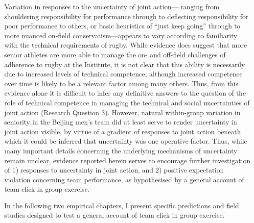 \begin{CJK}{UTF8}{gbsn}
Variation in responses to the uncertainty of joint action--- ranging from shouldering responsibility for performance through to deflecting responsibility for poor performance to others, or basic heuristics of ``just keep going'' through to more nuanced on-field conservatism---appears to vary according to familiarity with the technical requirements of rugby.  While evidence does suggest that more senior athletes are more able to manage the on- and off-field challenges of adherence to rugby at the Institute, it is not clear that this ability is necessarily due to increased levels of technical competence, although increased competence over time is likely to be a relevant factor among many others.  Thus, from this evidence alone it is difficult to infer any definitive answers to the question of the role of technical competence in managing the technical and social uncertainties of joint action (Research Question 3).  However, natural within-group variation in seniority in the Beijing men's team did at least serve to render uncertainty in joint action visible, by virtue of a gradient of responses to joint action beneath which it could be inferred that uncertainty was one operative factor.  Thus, while many important details concerning the underlying mechanisms of uncertainty remain unclear, evidence reported herein serves to encourage further investigation of 1) responses to uncertainty in joint action, and 2) positive expectation violation concerning team performance, as hypothesised by a general account of team click in group exercise.

In the following two empirical chapters, I present specific predictions and field studies designed to test a general account of team click in group exercise.
















                                                          \end{CJK}
